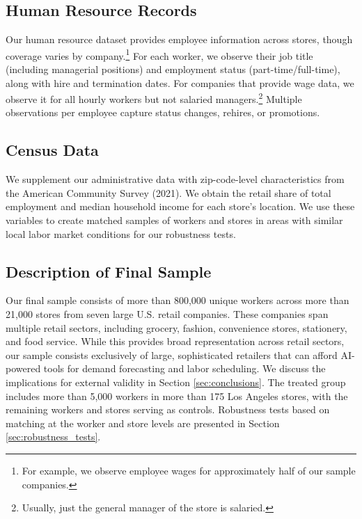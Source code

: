 \documentclass[letterpaper,11pt,leqno]{article}
\theoremstyle{paper}
\begin{document}
\subsection{Human Resource Records}

Our human resource dataset provides employee information across stores, though coverage varies by company.\footnote{For example, we observe employee wages for approximately half of our sample companies.} For each worker, we observe their job title (including managerial positions) and employment status (part-time/full-time), along with hire and termination dates. For companies that provide wage data, we observe it for all hourly workers but not salaried managers.\footnote{Usually, just the general manager of the store is salaried.} Multiple observations per employee capture status changes, rehires, or promotions.

\subsection{Census Data}
We supplement our administrative data with zip-code-level characteristics from the American Community Survey (2021). We obtain the retail share of total employment and median household income for each store's location. We use these variables to create matched samples of workers and stores in areas with similar local labor market conditions for our robustness tests. 



\subsection{Description of Final Sample} \label{subsec:summ_stats}

Our final sample consists of more than 800,000 unique workers across more than 21,000 stores from seven large U.S. retail companies. These companies span multiple retail sectors, including grocery, fashion, convenience stores, stationery, and food service. While this provides broad representation across retail sectors, our sample consists exclusively of large, sophisticated retailers that can afford AI-powered tools for demand forecasting and labor scheduling. We discuss the implications for external validity in Section \ref{sec:conclusions}. The treated group includes more than 5,000 workers in more than 175 Los Angeles stores, with the remaining workers and stores serving as controls. Robustness tests based on matching at the worker and store levels are presented in Section \ref{sec:robustness_tests}.
\end{document}

